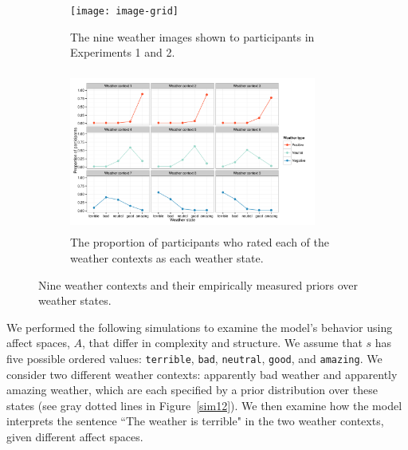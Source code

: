 \documentclass[10pt,letterpaper]{article}
\begin{document}
\begin{figure}
    \begin{subfigure}[b]{0.5\textwidth}
        \texttt{[image: image-grid]}
        \caption{The nine weather images shown to participants in Experiments 1 and 2.}
        \label{images}
    \end{subfigure}
    \hfill
    \begin{subfigure}[b]{0.5\textwidth}
        \includegraphics[width=230pt, height=150pt]{priors}
        \caption{The proportion of participants who rated each of the weather contexts as each weather state. 
     }
        \label{priors}
    \end{subfigure}
    \caption{Nine weather contexts and their empirically measured priors over weather states.}
    \label{fig:three graphs}
\end{figure}

We performed the following simulations to examine the model's behavior using affect spaces, $A$, that differ in complexity and structure.  
We assume that $s$ has five possible ordered values: \texttt{terrible}, \texttt{bad}, \texttt{neutral}, \texttt{good}, and \texttt{amazing}. We consider two different weather contexts: apparently bad weather and apparently amazing weather, which are each specified by a prior distribution over these states (see gray dotted lines in Figure~\ref{sim12}). We then examine how the model interprets the sentence ``The weather is terrible" in the two weather contexts, given different affect spaces.
\end{document}
